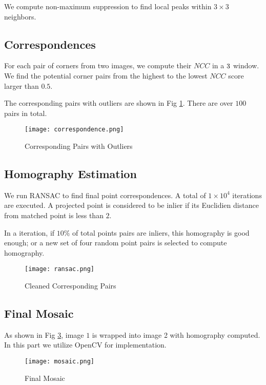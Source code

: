 \documentclass[letterpaper, 10 pt, conference]{ieeeconf}
\begin{document}
We compute non-maximum suppression to find local peaks within $3\times3$ neighbors.

\subsection{Correspondences}
For each pair of corners from two images, we compute their $NCC$ in a $3\time3$ window. We find the potential corner pairs from the highest to the lowest $NCC$ score larger than $0.5$.

The corresponding pairs with outliers are shown in Fig \ref{corr}. There are over $100$ pairs in total.

\begin{figure}[thpb]
\centering
\texttt{[image: correspondence.png]}
\caption{Corresponding Pairs with Outliers}
\label{corr}
\end{figure}


\subsection{Homography Estimation}
We run RANSAC to find final point correspondences. A total of $1\times10^4$ iterations are executed. A projected point is considered to be inlier if its Euclidien distance from matched point is less than $2$.

In a iteration, if $10\%$ of total points pairs are inliers, this
\newpage
\noindent homography is good enough; or a new set of four random point pairs is selected to compute homography.


\begin{figure}[thpb]
\centering
\texttt{[image: ransac.png]}
\caption{Cleaned Corresponding Pairs}
\label{clean}
\end{figure}

\subsection{Final Mosaic}
As shown in Fig \ref{mosaic}, image $1$ is wrapped into image 2 with homography computed. In this part we utilize OpenCV for implementation.

\begin{figure}[thpb]
\centering
\texttt{[image: mosaic.png]}
\caption{Final Mosaic}
\label{mosaic}
\end{figure}
\end{document}
